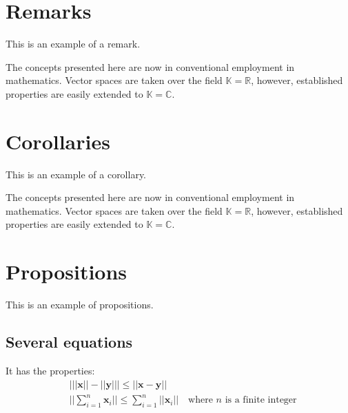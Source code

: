 \section{Remarks}

This is an example of a remark.

\begin{remark}
	The concepts presented here are now in conventional employment in mathematics. Vector spaces are taken over the field $\mathbb{K}=\mathbb{R}$, however, established properties are easily extended to $\mathbb{K}=\mathbb{C}$.
\end{remark}


\section{Corollaries}

This is an example of a corollary.

\begin{corollary}
	The concepts presented here are now in conventional employment in mathematics. Vector spaces are taken over the field $\mathbb{K}=\mathbb{R}$, however, established properties are easily extended to $\mathbb{K}=\mathbb{C}$.
\end{corollary}


\section{Propositions}

This is an example of propositions.

\subsection{Several equations}

\begin{proposition}
	It has the properties:
	\begin{align}
		& \big| ||\mathbf{x}|| - ||\mathbf{y}|| \big|\leq || \mathbf{x}- \mathbf{y}||\\
		&  ||\sum_{i=1}^n\mathbf{x}_i||\leq \sum_{i=1}^n||\mathbf{x}_i||\quad\text{where $n$ is a finite integer}
	\end{align}
\end{proposition}

